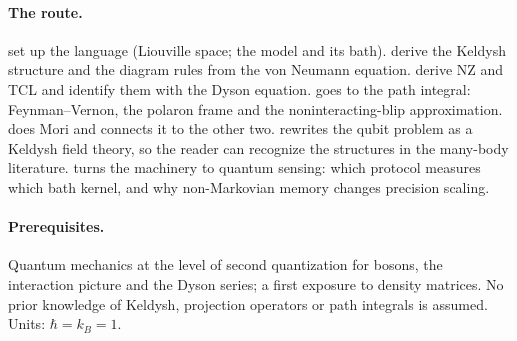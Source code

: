 \paragraph{The route.}
 set up the language (Liouville space; the model and its bath).
 derive the Keldysh structure and the diagram rules from the von Neumann equation.
 derive NZ and TCL and identify them with the Dyson equation.
 goes to the path integral: Feynman--Vernon, the polaron frame and the noninteracting-blip approximation.
 does Mori and connects it to the other two.
 rewrites the qubit problem as a Keldysh field theory, so the reader can recognize the structures in the many-body literature.
 turns the machinery to quantum sensing: which protocol measures which bath kernel, and why non-Markovian memory changes precision scaling.

\paragraph{Prerequisites.}
Quantum mechanics at the level of second quantization for bosons, the interaction picture and the Dyson series; a first exposure to density matrices.
No prior knowledge of Keldysh, projection operators or path integrals is assumed.
Units: $\hbar=k_B=1$.

\clearpage
